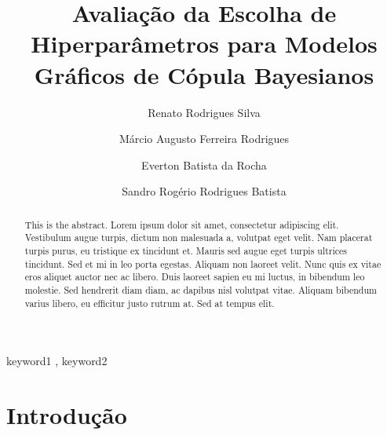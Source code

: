 \documentclass[
  super,
  preprint,
  3p]{elsarticle}
\begin{document}
\begin{frontmatter}
\title{Avaliação da Escolha de Hiperparâmetros para Modelos Gráficos de
Cópula Bayesianos}
\author[1]{Renato Rodrigues Silva%
%
}
\author[1]{Márcio Augusto Ferreira Rodrigues%
%
}
\author[1]{Everton Batista da Rocha%
%
}
\author[2,3]{Sandro Rogério Rodrigues Batista%
%
}





        
\begin{abstract}
This is the abstract. Lorem ipsum dolor sit amet, consectetur adipiscing
elit. Vestibulum augue turpis, dictum non malesuada a, volutpat eget
velit. Nam placerat turpis purus, eu tristique ex tincidunt et. Mauris
sed augue eget turpis ultrices tincidunt. Sed et mi in leo porta
egestas. Aliquam non laoreet velit. Nunc quis ex vitae eros aliquet
auctor nec ac libero. Duis laoreet sapien eu mi luctus, in bibendum leo
molestie. Sed hendrerit diam diam, ac dapibus nisl volutpat vitae.
Aliquam bibendum varius libero, eu efficitur justo rutrum at. Sed at
tempus elit.
\end{abstract}





\begin{keyword}
    keyword1 \sep 
    keyword2
\end{keyword}
\end{frontmatter}
    
\section{Introdução}\label{introduuxe7uxe3o}
\end{document}
